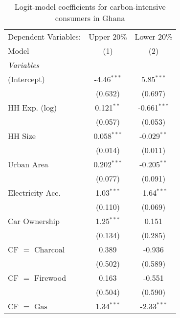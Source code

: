 
\begin{table}[htbp!]
   \centering
   \small
   \begin{adjustbox}{width = 1\textwidth, max height = 0.95\textheight, center}
      \begin{threeparttable}[b]
         \caption{\label{tab:Logit_1_GHA} Logit-model coefficients for carbon-intensive consumers in Ghana}
         \begin{tabular}{lcc}
            \tabularnewline \midrule \midrule
            Dependent Variables: & Upper 20\%    & Lower 20\%\\   
            Model                & (1)           & (2)\\  
            \midrule
            \emph{Variables}\\
            (Intercept)          & -4.46$^{***}$ & 5.85$^{***}$\\   
                                 & (0.632)       & (0.697)\\   
            HH Exp. (log)        & 0.121$^{**}$  & -0.661$^{***}$\\   
                                 & (0.057)       & (0.053)\\   
            HH Size              & 0.058$^{***}$ & -0.029$^{**}$\\   
                                 & (0.014)       & (0.011)\\   
            Urban Area           & 0.202$^{***}$ & -0.205$^{**}$\\   
                                 & (0.077)       & (0.091)\\   
            Electricity Acc.     & 1.03$^{***}$  & -1.64$^{***}$\\   
                                 & (0.110)       & (0.069)\\   
            Car Ownership        & 1.25$^{***}$  & 0.151\\   
                                 & (0.134)       & (0.285)\\   
            CF $=$ Charcoal      & 0.389         & -0.936\\   
                                 & (0.502)       & (0.589)\\   
            CF $=$ Firewood      & 0.163         & -0.551\\   
                                 & (0.504)       & (0.590)\\   
            CF $=$ Gas           & 1.34$^{***}$  & -2.33$^{***}$\\   

\end{tabular}
\end{threeparttable}
\end{adjustbox}
\end{table}
